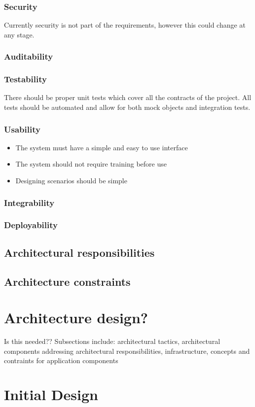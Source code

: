 \documentclass[a4paper,12pt]{article}
\begin{document}
\subsubsection{Security}
Currently security is not part of the requirements, however this could change at any stage.

\subsubsection{Auditability}

\subsubsection{Testability}
There should be proper unit tests which cover all the contracts of the project. All tests should be automated and allow for both mock objects and integration tests.

\subsubsection{Usability}
	\begin{itemize}
		\item The system must have a simple and easy to use interface
		\item The system should not require training before use
		\item Designing scenarios should be simple
	\end{itemize}

\subsubsection{Integrability}

\subsubsection{Deployability}

\subsection{Architectural responsibilities}

\subsection{Architecture constraints}

\section{Architecture design?}
	Is this needed?? Subsections include: architectural tactics, architectural components addressing architectural responsibilities, infrastructure, concepts and contraints for application components

\newpage
%
%




\section{Initial Design}  %


\newpage
%
%
\end{document}
